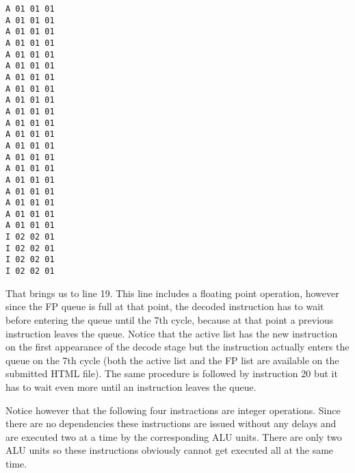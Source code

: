 \documentclass[paper=a4, fontsize=11pt]{scrartcl}
\numberwithin{equation}{section}		%
\numberwithin{figure}{section}			%
\numberwithin{table}{section}				%
\begin{document}
\newpage

\begin{lstlisting}[caption=Fortunate Instruction Mix - Trace File]
A 01 01 01
A 01 01 01
A 01 01 01
A 01 01 01
A 01 01 01
A 01 01 01
A 01 01 01
A 01 01 01
A 01 01 01
A 01 01 01
A 01 01 01
A 01 01 01
A 01 01 01
A 01 01 01
A 01 01 01
A 01 01 01
A 01 01 01
A 01 01 01
A 01 01 01
A 01 01 01
I 02 02 01
I 02 02 01
I 02 02 01
I 02 02 01
\end{lstlisting}



That brings us to line 19. This line includes a floating point operation, however since the FP queue is full at that point, the decoded instruction has to wait before entering the queue until the 7th cycle, because at that point a previous instruction leaves the queue. Notice that the active list has the new instruction on the first appearance of the decode stage but the instruction actually enters the queue on the 7th cycle (both the active list and the FP list are available on the submitted HTML file). The same procedure is followed by instruction 20 but it has to wait even more until an instruction leaves the queue. 

Notice however that the following four instractions are integer operations. Since there are no dependencies these instructions are issued without any delays and are executed two at a time by the corresponding ALU units. There are only two ALU units so these instructions obviously cannot get executed all at the same time.


\end{document}
